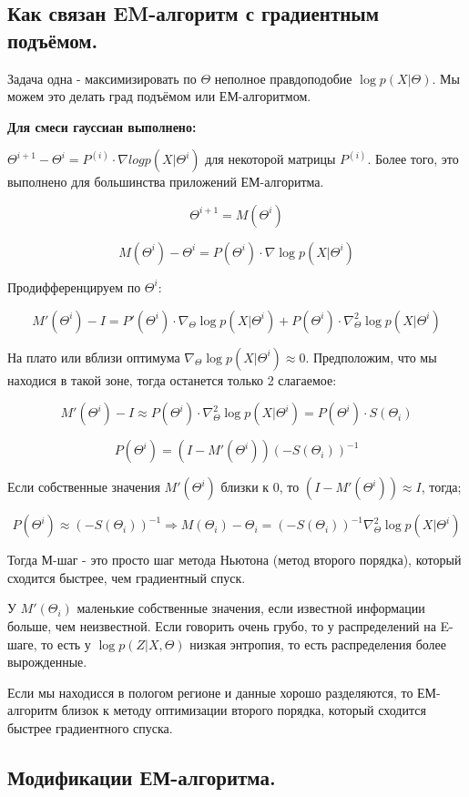 \documentclass[12pt]{article}
\begin{document}
\subsection*{Как связан EM-алгоритм с градиентным подъёмом.}

Задача одна - максимизировать по $\Theta$ неполное правдоподобие $\log p(X| \Theta)$. Мы можем это делать град подъёмом или ЕМ-алгоритмом.

\textbf{Для смеси гауссиан выполнено:}

$\Theta^{i+1} - \Theta^i = P^{(i)} \cdot \nabla log p(X|\Theta^i)$ для некоторой матрицы $P^{(i)}$. Более того, это выполнено для большинства приложений ЕМ-алгоритма.

\[ \Theta^{i+1} = M(\Theta^i) \]

\[ M(\Theta^i) - \Theta^i = P(\Theta^i) \cdot \nabla \log p(X|\Theta^i) \]

Продифференцируем по $\Theta^i$:

\[ M'(\Theta^i) - I = P'(\Theta^i) \cdot \nabla_\Theta \log p(X|\Theta^i) + P(\Theta^i) \cdot \nabla_\Theta^2 \log p(X|\Theta^i) \]

На плато или вблизи оптимума $\nabla_\Theta \log p(X|\Theta^i) \approx 0$. Предположим, что мы находися в такой зоне, тогда останется только 2 слагаемое:

\[ M'(\Theta^i) - I \approx P(\Theta^i) \cdot \nabla_\Theta^2 \log p(X|\Theta^i) = P(\Theta^i) \cdot S(\Theta_i)\]

\[ P(\Theta^i) = (I - M'(\Theta^i))(-S(\Theta_i))^{-1} \]

Если собственные значения $M'(\Theta^i)$ близки к 0, то $(I - M'(\Theta^i)) \approx I$, тогда;

\[ P(\Theta^i) \approx (-S(\Theta_i))^{-1} \Rightarrow M(\Theta_i) - \Theta_i = (-S(\Theta_i))^{-1} \nabla_\Theta^2 \log p(X|\Theta^i)\]

Тогда М-шаг - это просто шаг метода Ньютона (метод второго порядка), который сходится быстрее, чем градиентный спуск.

У $M'(\Theta_i)$ маленькие собственные значения, если известной информации больше, чем неизвестной. Если говорить очень грубо, то у распределений на E-шаге, то есть у $\log p(Z|X, \Theta)$ низкая энтропия, то есть распределения более вырожденные.

Если мы находисся в пологом регионе и данные хорошо разделяются, то ЕМ-алгоритм близок к методу оптимизации второго порядка, который сходится быстрее градиентного спуска.

\subsection*{Модификации ЕМ-алгоритма.}
\end{document}
